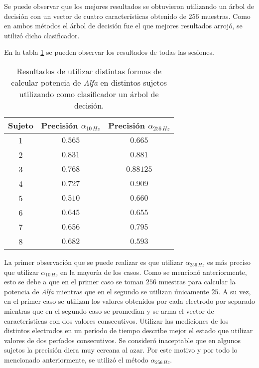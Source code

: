 Se puede observar que los mejores resultados se obtuvieron utilizando un árbol de decisión con un vector de cuatro características obtenido de $256$ muestras. Como en ambos métodos el árbol de decisión fue el que mejores resultados arrojó, se utilizó dicho clasificador.

En la tabla \ref{tab:eeg-results} se pueden observar los resultados de todas las sesiones.

\begin{table}[H]
\centering
\begin{tabular}{ |c|c|c| } 
 \hline
 Sujeto & Precisión $\alpha_{10 \, Hz}$ &  Precisión $\alpha_{256 \, Hz}$ \\ 
 \hline
 1 & $0.565$ & $0.665$ \\
 \hline
 2 & $0.831$ & $0.881$ \\
 \hline
 3 & $0.768$ & $0.88125$ \\
 \hline
 4  & $0.727$ & $0.909$ \\
 \hline
  5 & $0.510$ & $0.660$ \\
 \hline
 6 & $0.645$ & $0.655$ \\
 \hline
 7 & $0.656$ & $0.795$ \\
 \hline
 8  & $0.682$ & $0.593$ \\
 \hline

 \hline
\end{tabular}
\caption{Resultados de utilizar distintas formas de calcular potencia de \emph{Alfa} en distintos sujetos utilizando como clasificador un árbol de decisión.}
\label{tab:eeg-results}
\end{table}

La primer observación que se puede realizar es que utilizar $\alpha_{256 \, Hz}$ es más preciso que utilizar $\alpha_{10 \, Hz}$ en la mayoría de los casos. Como se mencionó anteriormente, esto se debe a que en el primer caso se toman $256$ muestras para calcular la potencia de \emph{Alfa} mientras que en el segundo se utilizan únicamente $25$. A su vez, en el primer caso se utilizan los valores obtenidos por cada electrodo por separado mientras que en el segundo caso se promedian y se arma el vector de características con dos valores consecutivos. Utilizar las mediciones de los distintos electrodos en un período de tiempo describe mejor el estado que utilizar valores de dos períodos consecutivos. Se consideró inaceptable que en algunos sujetos la precisión diera muy cercana al azar. Por este motivo y por todo lo mencionado anteriormente, se utilizó el método $\alpha_{256 \, Hz}$.

